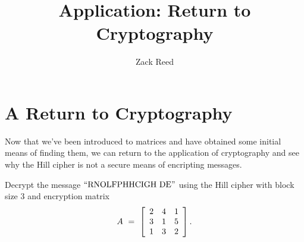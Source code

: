\documentclass{ximera}
\author{Zack Reed}
\title{Application: Return to Cryptography}
\begin{document}
\begin{abstract}

\end{abstract}
\maketitle


\section*{A Return to Cryptography}

Now that we've been introduced to matrices and have obtained some initial means of finding them, we can return to the application of cryptography and see why the Hill cipher is not a secure means of encripting messages.

\begin{example}\label{ex:hill-cipher-decryption}
  Decrypt the message $\q{RNOLFPHHCIGH DE}$ using the Hill cipher with
  block size $3$ and encryption matrix
  \begin{equation*}
    A ~=~ \startmat{ccc}
      2 & 4 & 1 \\
      3 & 1 & 5 \\
      1 & 3 & 2 \\
    \stopmat.
  \end{equation*}
\end{example}
\end{document}
